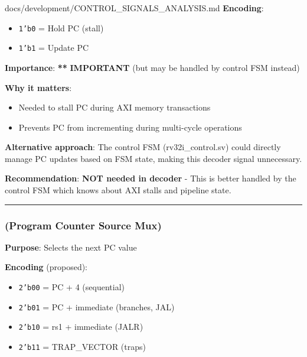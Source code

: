 \begin{relocated}{docs/development/CONTROL_SIGNALS_ANALYSIS.md}
\textbf{Encoding}:

\begin{itemize}
\tightlist
\item
  \texttt{1'b0} = Hold PC (stall)
\item
  \texttt{1'b1} = Update PC
\end{itemize}

\textbf{Importance}: \textbf{*}\textbf{*} \textbf{IMPORTANT} (but may be
handled by control FSM instead)

\textbf{Why it matters}:

\begin{itemize}
\tightlist
\item
  Needed to stall PC during AXI memory transactions
\item
  Prevents PC from incrementing during multi-cycle operations
\end{itemize}

\textbf{Alternative approach}: The control FSM
(rv32i\_\allowbreak{}control.sv) could directly manage PC updates based
on FSM state, making this decoder signal unnecessary.

\textbf{Recommendation}: \bad{} \textbf{NOT needed in decoder} - This is
better handled by the control FSM which knows about AXI stalls and
pipeline state.

\begin{center}\rule{0.5\linewidth}{0.5pt}\end{center}

\subsubsection{\texorpdfstring{ (Program Counter Source
Mux)}{(Program Counter Source Mux)}}\label{tm:flow:control-signals-analysis:3-pc-src-program-counter-source-mux}

\textbf{Purpose}: Selects the next PC value

\textbf{Encoding} (proposed):

\begin{itemize}
\tightlist
\item
  \texttt{2'b00} = PC + 4 (sequential)
\item
  \texttt{2'b01} = PC + immediate (branches, JAL)
\item
  \texttt{2'b10} = rs1 + immediate (JALR)
\item
  \texttt{2'b11} = TRAP\_\allowbreak{}VECTOR (traps)
\end{itemize}


\end{relocated}
